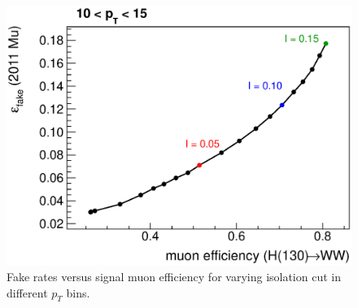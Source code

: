 \begin{figure}[!htbp]
\begin{center}
\includegraphics[scale=0.4]{figures/isoscan2.eps}
\caption{Fake rates versus signal muon efficiency for varying isolation cut in different $p_T$ bins.}
\label{fig:isoscan}
\end{center}
\end{figure}

